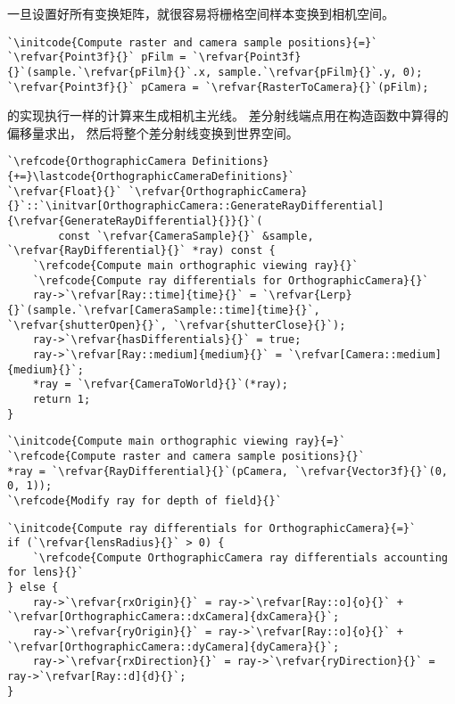 一旦设置好所有变换矩阵，就很容易将栅格空间样本变换到相机空间。
\begin{lstlisting}
`\initcode{Compute raster and camera sample positions}{=}`
`\refvar{Point3f}{}` pFilm = `\refvar{Point3f}{}`(sample.`\refvar{pFilm}{}`.x, sample.`\refvar{pFilm}{}`.y, 0);
`\refvar{Point3f}{}` pCamera = `\refvar{RasterToCamera}{}`(pFilm);
\end{lstlisting}

的实现执行一样的计算来生成相机主光线。
差分射线端点用在构造函数中算得的偏移量求出，
然后将整个差分射线变换到世界空间。
\begin{lstlisting}
`\refcode{OrthographicCamera Definitions}{+=}\lastcode{OrthographicCameraDefinitions}`
`\refvar{Float}{}` `\refvar{OrthographicCamera}{}`::`\initvar[OrthographicCamera::GenerateRayDifferential]{\refvar{GenerateRayDifferential}{}}{}`(
        const `\refvar{CameraSample}{}` &sample, `\refvar{RayDifferential}{}` *ray) const {
    `\refcode{Compute main orthographic viewing ray}{}`
    `\refcode{Compute ray differentials for OrthographicCamera}{}`
    ray->`\refvar[Ray::time]{time}{}` = `\refvar{Lerp}{}`(sample.`\refvar[CameraSample::time]{time}{}`, `\refvar{shutterOpen}{}`, `\refvar{shutterClose}{}`);
    ray->`\refvar{hasDifferentials}{}` = true;
    ray->`\refvar[Ray::medium]{medium}{}` = `\refvar[Camera::medium]{medium}{}`;
    *ray = `\refvar{CameraToWorld}{}`(*ray);
    return 1;
}
\end{lstlisting}
\begin{lstlisting}
`\initcode{Compute main orthographic viewing ray}{=}`
`\refcode{Compute raster and camera sample positions}{}`
*ray = `\refvar{RayDifferential}{}`(pCamera, `\refvar{Vector3f}{}`(0, 0, 1));
`\refcode{Modify ray for depth of field}{}`
\end{lstlisting}
\begin{lstlisting}
`\initcode{Compute ray differentials for OrthographicCamera}{=}`
if (`\refvar{lensRadius}{}` > 0) {
    `\refcode{Compute OrthographicCamera ray differentials accounting for lens}{}`
} else {
    ray->`\refvar{rxOrigin}{}` = ray->`\refvar[Ray::o]{o}{}` + `\refvar[OrthographicCamera::dxCamera]{dxCamera}{}`;
    ray->`\refvar{ryOrigin}{}` = ray->`\refvar[Ray::o]{o}{}` + `\refvar[OrthographicCamera::dyCamera]{dyCamera}{}`;
    ray->`\refvar{rxDirection}{}` = ray->`\refvar{ryDirection}{}` = ray->`\refvar[Ray::d]{d}{}`;
}
\end{lstlisting}

